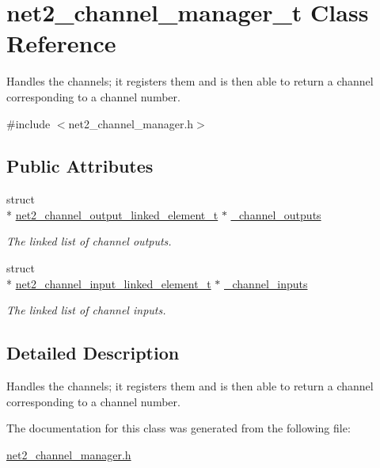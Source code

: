 \hypertarget{structnet2__channel__manager__t}{\section{net2\-\_\-channel\-\_\-manager\-\_\-t Class Reference}
\label{structnet2__channel__manager__t}
}


Handles the channels; it registers them and is then able to return a channel corresponding to a channel number.  




{\ttfamily \#include $<$net2\-\_\-channel\-\_\-manager.\-h$>$}

\subsection*{Public Attributes}
\begin{DoxyCompactItemize}
\item 
\hypertarget{structnet2__channel__manager__t_a994bf9242cb70c45711e2a670123a18e}{struct \\*
\hyperlink{structnet2__channel__output__linked__element__t}{net2\-\_\-channel\-\_\-output\-\_\-linked\-\_\-element\-\_\-t} $\ast$ \hyperlink{structnet2__channel__manager__t_a994bf9242cb70c45711e2a670123a18e}{\-\_\-channel\-\_\-outputs}}\label{structnet2__channel__manager__t_a994bf9242cb70c45711e2a670123a18e}

\begin{DoxyCompactList}\small\item\em The linked list of channel outputs. \end{DoxyCompactList}\item 
\hypertarget{structnet2__channel__manager__t_a3e16fdcf5489413c2fabc6c009545ae1}{struct \\*
\hyperlink{structnet2__channel__input__linked__element__t}{net2\-\_\-channel\-\_\-input\-\_\-linked\-\_\-element\-\_\-t} $\ast$ \hyperlink{structnet2__channel__manager__t_a3e16fdcf5489413c2fabc6c009545ae1}{\-\_\-channel\-\_\-inputs}}\label{structnet2__channel__manager__t_a3e16fdcf5489413c2fabc6c009545ae1}

\begin{DoxyCompactList}\small\item\em The linked list of channel inputs. \end{DoxyCompactList}\end{DoxyCompactItemize}


\subsection{Detailed Description}
Handles the channels; it registers them and is then able to return a channel corresponding to a channel number. 

The documentation for this class was generated from the following file\-:\begin{DoxyCompactItemize}
\item 
\hyperlink{net2__channel__manager_8h}{net2\-\_\-channel\-\_\-manager.\-h}\end{DoxyCompactItemize}
